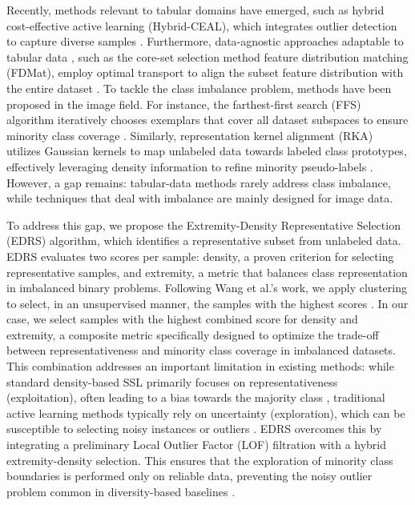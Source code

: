 \documentclass[preprint,12pt]{elsarticle}
\begin{document}
Recently, methods relevant to tabular domains have emerged, such as hybrid cost-effective active learning (Hybrid-CEAL), which integrates outlier detection to capture diverse samples \cite{shankaranarayana2024hybrid}. Furthermore, data-agnostic approaches adaptable to tabular data \cite{hadar2024datamap}, such as the core-set selection method feature distribution matching (FDMat), employ optimal transport to align the subset feature distribution with the entire dataset \cite{xiao2024feature}. To tackle the class imbalance problem, methods have been proposed in the image field. For instance, the farthest-first search (FFS) algorithm iteratively chooses exemplars that cover all dataset subspaces to ensure minority class coverage \cite{you2020self}. Similarly, representation kernel alignment (RKA) utilizes Gaussian kernels to map unlabeled data towards labeled class prototypes, effectively leveraging density information to refine minority pseudo-labels \cite{li2025kernel}. However, a gap remains: tabular-data methods rarely address class imbalance, while techniques that deal with imbalance are mainly designed for image data.

To address this gap, we propose the Extremity-Density Representative Selection (EDRS) algorithm, which identifies a representative subset from unlabeled data. EDRS evaluates two scores per sample: density, a proven criterion for selecting representative samples, and extremity, a metric that balances class representation in imbalanced binary problems. Following Wang et al.'s work, we apply clustering to select, in an unsupervised manner, the samples with the highest scores \cite{wang2022unsupervised}. In our case, we select samples with the highest combined score for density and extremity, a composite metric specifically designed to optimize the trade-off between representativeness and minority class coverage in imbalanced datasets. This combination addresses an important limitation in existing methods: while standard density-based SSL primarily focuses on representativeness (exploitation), often leading to a bias towards the majority class \cite{wang2022debiased, li2024class}, traditional active learning methods typically rely on uncertainty (exploration), which can be susceptible to selecting noisy instances or outliers \cite{li2024active, kasarla2024maximally}. EDRS overcomes this by integrating a preliminary Local Outlier Factor (LOF) filtration with a hybrid extremity-density selection. This ensures that the exploration of minority class boundaries is performed only on reliable data, preventing the noisy outlier problem common in diversity-based baselines \cite{shao2024enhancing, xiao2024feature}.
\end{document}
